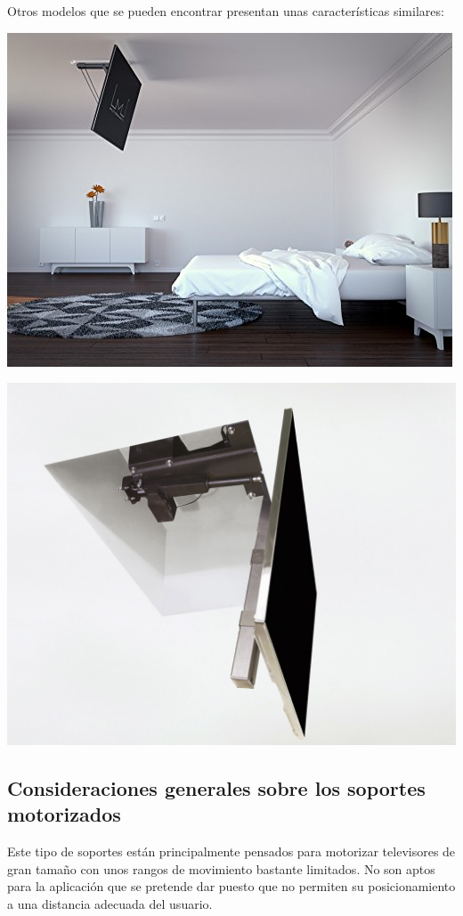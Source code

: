  \vspace{0.1cm}
Otros modelos que se pueden encontrar presentan unas características similares:

\begin{minipage}{0.5\textwidth}
   \includegraphics[width=0.8\linewidth]{figuras/Imagenes_EstadoArte/not_valid_2.jpg}
\end{minipage}
\begin{minipage}{0.5\textwidth}
   \includegraphics[width=0.8\linewidth]{figuras/Imagenes_EstadoArte/not_valid_3.jpg}
\end{minipage}
 \subsection{Consideraciones generales sobre los soportes motorizados}

    Este tipo de soportes están principalmente pensados para motorizar televisores de gran tamaño con unos rangos de movimiento bastante limitados. No son aptos para la aplicación que se pretende dar puesto que no permiten su posicionamiento a una distancia adecuada del usuario.

